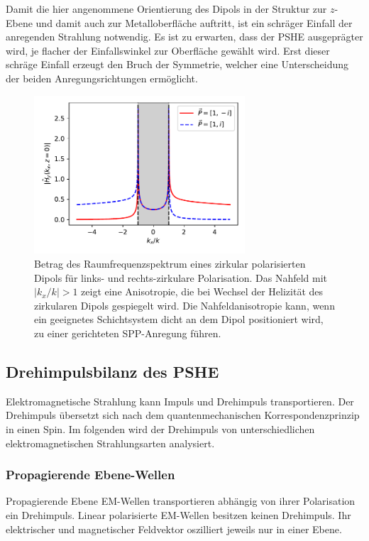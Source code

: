 \documentclass[a4paper, titlepage,  ngerman, fullpage]{book}
\begin{document}
	Damit die hier angenommene Orientierung des Dipols in der Struktur zur $z$-Ebene und damit auch zur Metalloberfläche auftritt, ist ein schräger Einfall der anregenden Strahlung notwendig. Es ist zu erwarten, dass der PSHE ausgeprägter wird, je flacher der Einfallswinkel zur Oberfläche gewählt wird. Erst dieser schräge Einfall erzeugt den Bruch der Symmetrie, welcher eine Unterscheidung der beiden Anregungsrichtungen ermöglicht.
	\begin{figure}
		\centering
		\includegraphics[width=0.7\textwidth]{figures/spatial_spectrum_circ.pdf}
		\caption[Raumfrequenzspektrum zirkular polarisierter Dipol]{Betrag des Raumfrequenzspektrum eines zirkular polarisierten Dipols für links- und rechts-zirkulare Polarisation. Das Nahfeld mit $|k_x/k| >1$ zeigt eine Anisotropie, die bei Wechsel der Helizität des zirkularen Dipols gespiegelt wird. Die Nahfeldanisotropie kann, wenn ein geeignetes Schichtsystem dicht an dem Dipol positioniert wird, zu einer gerichteten SPP-Anregung führen.}
		\label{fig:spatial_spectrum_circ}
	\end{figure}	
	
	
	
	\subsection{Drehimpulsbilanz des PSHE}
	\label{sec:spin_spp}
	Elektromagnetische Strahlung kann Impuls und Drehimpuls transportieren. Der Drehimpuls übersetzt sich nach dem quantenmechanischen Korrespondenzprinzip in einen Spin. Im folgenden wird der Drehimpuls von unterschiedlichen elektromagnetischen Strahlungsarten analysiert.
	\subsubsection{Propagierende Ebene-Wellen}
	Propagierende Ebene EM-Wellen transportieren abhängig von ihrer Polarisation ein Drehimpuls. Linear polarisierte EM-Wellen besitzen keinen Drehimpuls. Ihr elektrischer und magnetischer Feldvektor oszilliert jeweils nur in einer Ebene.
	
\end{document}
